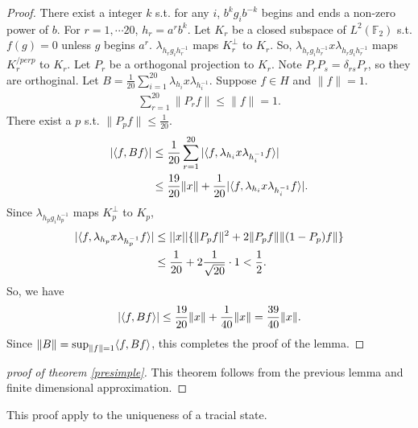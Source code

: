 \begin{proof}
  There exist a integer $k$ s.t. for any $i$, $b^k g_i b^{-k}$ begins and ends a non-zero power of $b$.
  For $r = 1, \cdots 20$, $h_r = a^r b^k$.
  Let $K_r$ be a closed subspace of $L^2(\mathbb{F}_2)$ s.t. $f(g) = 0$ unless $g$ begins $a^r$.
  $\lambda_{h_r g_i h_r^{-1}}$ maps $K_r^{\perp}$ to $K_r$.
  So, $\lambda_{h_r g_i h_r^{-1}} x \lambda_{h_r g_i h_r^{-1}}$ maps $K_r^{/perp}$ to $K_r$.
  Let $P_r$ be a orthogonal projection to $K_r$.
  Note $P_r P_s = \delta_{rs}P_r$, so they are orthoginal. 
  Let $B = \frac{1}{20} \sum_{i=1}^{20} \lambda_{h_i} x \lambda_{h_i^{-1}}$. 
  Suppose $f \in H$ and $\|f\| = 1$.
  \begin{align*}
    \sum_{r=1}^{20} \|P_rf\| \leq \|f\| = 1.
  \end{align*}
  There exist a $p$ s.t. $\|P_p f\| \leq \frac{1}{20}$.
  \begin{align*}
    |\langle f, Bf\rangle| & \leq \frac{1}{20} \sum_{r=1}^{20} |\langle f, \lambda_{h_i} x \lambda_{h_i^{-1}} f\rangle|\\
    &\leq \frac{19}{20} \|x\| + \frac{1}{20}|\langle f, \lambda_{h_i} x \lambda_{h_i^{-1}} f\rangle|.
  \end{align*}
  Since $\lambda_{h_p g_i h_p^{-1}}$ maps $K_p^{\perp}$ to $K_p$,
  \begin{align*}
    |\langle f, \lambda_{h_p} x \lambda_{h_p^{-1}} f\rangle| &\leq ||x|| \{ \| P_p f\|^2 + 2\|P_p f\| \|(1-P_p)f\|\}\\
    &\leq \frac{1}{20} + 2 \frac{1}{\sqrt{20}}\cdot 1 < \frac{1}{2}.     
  \end{align*}
  So, we have
  \begin{align*}
    |\langle f, Bf\rangle| \leq \frac{19}{20} \|x\| + \frac{1}{40}\|x\| = \frac{39}{40} \|x\|.
  \end{align*}
  Since $\| B \| = \sup_{\|f\|=1}\langle f,Bf\rangle$, this completes the proof of the lemma.
\end{proof}

\begin{proof}[proof of theorem \ref{presimple}]
  This theorem follows from the previous lemma and finite dimensional approximation.
\end{proof}

This proof apply to the uniqueness of a tracial state.
